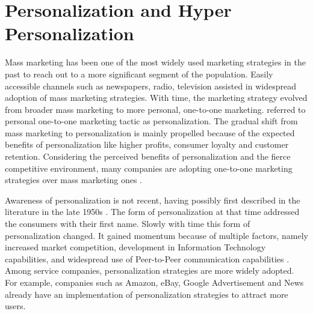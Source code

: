 \section{Personalization and Hyper Personalization}
Mass marketing has been one of the most widely used marketing strategies in the past to reach out to a more significant segment of the population. Easily accessible channels such as newspapers, radio, television assisted in widespread adoption of mass marketing strategies. With time, the marketing strategy evolved from broader mass marketing to more personal, one-to-one marketing. \textcite[306]{Arora2008} referred to personal one-to-one marketing tactic as personalization. The gradual shift from mass marketing to personalization is mainly propelled because of the expected benefits of personalization like higher profits, consumer loyalty and customer retention. Considering the perceived benefits of personalization and the fierce competitive environment, many companies are adopting one-to-one marketing strategies over mass marketing ones \autocite[409]{Vesanen2007}. \\ \par


Awareness of personalization is not recent, having possibly first described in the literature in the late 1950s \autocite[4]{WendellRSmith1956}. The form of personalization at that time addressed the consumers with their first name. Slowly with time this form of personalization changed. It gained momentum because of multiple factors, namely increased market competition, development in Information Technology capabilities, and widespread use of Peer-to-Peer communication capabilities \autocite[540]{Kumar2007}. Among service companies, personalization strategies are more widely adopted. For example, companies such as Amazon, eBay, Google Advertisement and News already have an implementation of personalization strategies to attract more users. \\ \par



